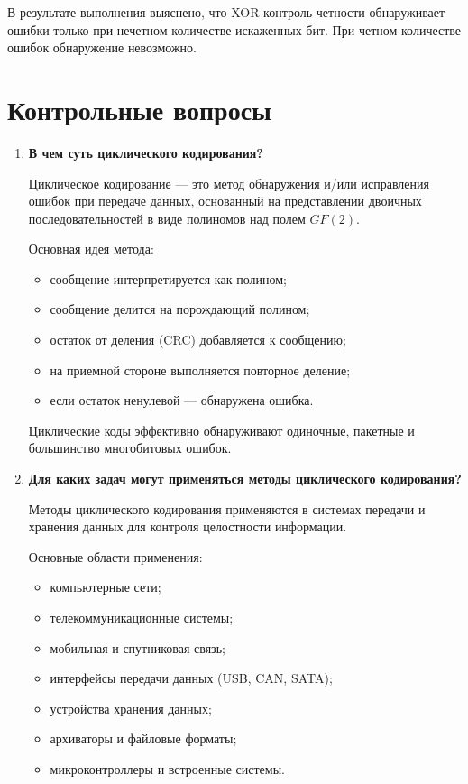 \documentclass[a4paper, 14pt]{article}
\begin{document}
В результате выполнения выяснено, что XOR-контроль четности обнаруживает ошибки только при нечетном количестве искаженных бит.
При четном количестве ошибок обнаружение невозможно.

\section{Контрольные вопросы}

\begin{enumerate}
  \item \textbf{В чем суть циклического кодирования?}

    Циклическое кодирование --- это метод обнаружения и/или исправления ошибок при передаче данных, основанный на представлении двоичных последовательностей в виде полиномов над полем $GF(2)$.

    Основная идея метода:
    \begin{itemize}
      \item сообщение интерпретируется как полином;
      \item сообщение делится на порождающий полином;
      \item остаток от деления (CRC) добавляется к сообщению;
      \item на приемной стороне выполняется повторное деление;
      \item если остаток ненулевой --- обнаружена ошибка.
    \end{itemize}

    Циклические коды эффективно обнаруживают одиночные, пакетные и большинство многобитовых ошибок.

  \item \textbf{Для каких задач могут применяться методы циклического кодирования?}

    Методы циклического кодирования применяются в системах передачи и хранения данных для контроля целостности информации.

    Основные области применения:
    \begin{itemize}
      \item компьютерные сети;
      \item телекоммуникационные системы;
      \item мобильная и спутниковая связь;
      \item интерфейсы передачи данных (USB, CAN, SATA);
      \item устройства хранения данных;
      \item архиваторы и файловые форматы;
      \item микроконтроллеры и встроенные системы.
    \end{itemize}


\end{enumerate}
\end{document}
